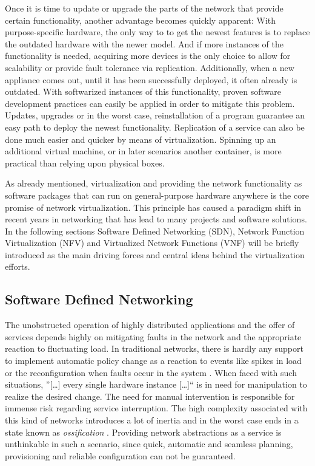 Once it is time to update or upgrade the parts of the network that provide certain functionality, another advantage becomes quickly apparent: With purpose-specific hardware, the only way to to get the newest features is to replace the outdated hardware with the newer model. And if more instances of the functionality is needed, acquiring more devices is the only choice to allow for scalability or provide fault tolerance via replication. Additionally, when a new appliance comes out, until it has been successfully deployed, it often already is outdated. With softwarized instances of this functionality, proven software development practices can easily be applied in order to mitigate this problem. Updates, upgrades or in the worst case, reinstallation of a program guarantee an easy path to deploy the newest functionality. Replication of a service can also be done much easier and quicker by means of virtualization. Spinning up an additional virtual machine, or in later scenarios another container, is more practical than relying upon physical boxes. 

As already mentioned, virtualization and providing the network functionality as software packages that can run on general-purpose hardware anywhere is the core promise of network virtualization. This principle has caused a paradigm shift in recent years in networking that has lead to many projects and software solutions. In the following sections Software Defined Networking (SDN), Network Function Virtualization (NFV) and Virtualized Network Functions (VNF) will be briefly introduced as the main driving forces and central ideas behind the virtualization efforts. 


\subsection{Software Defined Networking}
\label{sec:sdn}
The unobstructed operation of highly distributed applications and the offer of services depends highly on mitigating faults in the network and the appropriate reaction to fluctuating load. In traditional networks, there is hardly any support to implement automatic policy change as a reaction to events like spikes in load or the reconfiguration when faults occur in the system \cite{kreutz2015software}. When faced with such situations, ''[\dots] every single hardware instance [\dots]`` \cite{grossmann2013auto} is in need for manipulation to realize the desired change.  The need for manual intervention is responsible for immense risk regarding service interruption. The high complexity associated with this kind of networks introduces a lot of inertia and in the worst case ends in a state known as \textit{ossification} \cite{nunes2014survey}. Providing network abstractions as a service is unthinkable in such a scenario, since quick, automatic and seamless planning, provisioning and reliable configuration can not be guaranteed.

